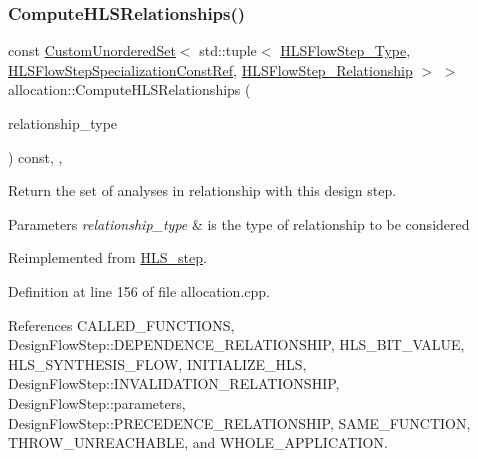 \subsubsection{\texorpdfstring{Compute\+H\+L\+S\+Relationships()}{ComputeHLSRelationships()}}
{\footnotesize\ttfamily const \hyperlink{classCustomUnorderedSet}{Custom\+Unordered\+Set}$<$ std\+::tuple$<$ \hyperlink{hls__step_8hpp_ada16bc22905016180e26fc7e39537f8d}{H\+L\+S\+Flow\+Step\+\_\+\+Type}, \hyperlink{hls__step_8hpp_a5fdd2edf290c196531d21d68e13f0e74}{H\+L\+S\+Flow\+Step\+Specialization\+Const\+Ref}, \hyperlink{hls__step_8hpp_a3ad360b9b11e6bf0683d5562a0ceb169}{H\+L\+S\+Flow\+Step\+\_\+\+Relationship} $>$ $>$ allocation\+::\+Compute\+H\+L\+S\+Relationships (\begin{DoxyParamCaption}\item[{const \hyperlink{classDesignFlowStep_a723a3baf19ff2ceb77bc13e099d0b1b7}{Design\+Flow\+Step\+::\+Relationship\+Type}}]{relationship\+\_\+type }\end{DoxyParamCaption}) const\hspace{0.3cm}{\ttfamily [override]}, {\ttfamily [protected]}, {\ttfamily [virtual]}}



Return the set of analyses in relationship with this design step. 


\begin{DoxyParams}{Parameters}
{\em relationship\+\_\+type} & is the type of relationship to be considered \\
\hline
\end{DoxyParams}


Reimplemented from \hyperlink{classHLS__step_aed0ce8cca9a1ef18e705fc1032ad4de5}{H\+L\+S\+\_\+step}.



Definition at line 156 of file allocation.\+cpp.



References C\+A\+L\+L\+E\+D\+\_\+\+F\+U\+N\+C\+T\+I\+O\+NS, Design\+Flow\+Step\+::\+D\+E\+P\+E\+N\+D\+E\+N\+C\+E\+\_\+\+R\+E\+L\+A\+T\+I\+O\+N\+S\+H\+IP, H\+L\+S\+\_\+\+B\+I\+T\+\_\+\+V\+A\+L\+UE, H\+L\+S\+\_\+\+S\+Y\+N\+T\+H\+E\+S\+I\+S\+\_\+\+F\+L\+OW, I\+N\+I\+T\+I\+A\+L\+I\+Z\+E\+\_\+\+H\+LS, Design\+Flow\+Step\+::\+I\+N\+V\+A\+L\+I\+D\+A\+T\+I\+O\+N\+\_\+\+R\+E\+L\+A\+T\+I\+O\+N\+S\+H\+IP, Design\+Flow\+Step\+::parameters, Design\+Flow\+Step\+::\+P\+R\+E\+C\+E\+D\+E\+N\+C\+E\+\_\+\+R\+E\+L\+A\+T\+I\+O\+N\+S\+H\+IP, S\+A\+M\+E\+\_\+\+F\+U\+N\+C\+T\+I\+ON, T\+H\+R\+O\+W\+\_\+\+U\+N\+R\+E\+A\+C\+H\+A\+B\+LE, and W\+H\+O\+L\+E\+\_\+\+A\+P\+P\+L\+I\+C\+A\+T\+I\+ON.

